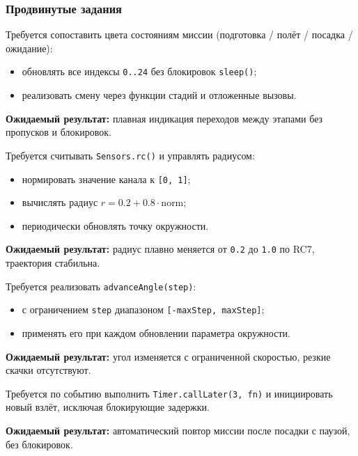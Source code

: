 \subsubsection{Продвинутые задания}

\begin{taskbox}
Требуется сопоставить цвета состояниям миссии (подготовка / полёт / посадка / ожидание):
\begin{itemize}
    \item обновлять все индексы \texttt{0..24} без блокировок \texttt{sleep()};
    \item реализовать смену через функции стадий и отложенные вызовы.
\end{itemize}

\textbf{Ожидаемый результат:} плавная индикация переходов между этапами без пропусков и блокировок.
\end{taskbox}

\begin{taskbox}
Требуется считывать \texttt{Sensors.rc()} и управлять радиусом:
\begin{itemize}
    \item нормировать значение канала к \texttt{[0, 1]};
    \item вычислять радиус \(r = 0.2 + 0.8 \cdot \text{norm}\);
    \item периодически обновлять точку окружности.
\end{itemize}

\textbf{Ожидаемый результат:} радиус плавно меняется от \texttt{0.2} до \texttt{1.0} по RC7, траектория стабильна.
\end{taskbox}

\begin{taskbox}
Требуется реализовать \texttt{advanceAngle(step)}:
\begin{itemize}
    \item с ограничением \texttt{step} диапазоном \texttt{[-maxStep, maxStep]};
    \item применять его при каждом обновлении параметра окружности.
\end{itemize}

\textbf{Ожидаемый результат:} угол изменяется с ограниченной скоростью, резкие скачки отсутствуют.
\end{taskbox}

\begin{taskbox}
Требуется по событию выполнить \texttt{Timer.callLater(3, fn)} и инициировать новый взлёт, исключая блокирующие задержки.

\textbf{Ожидаемый результат:} автоматический повтор миссии после посадки с паузой, без блокировок.
\end{taskbox}

